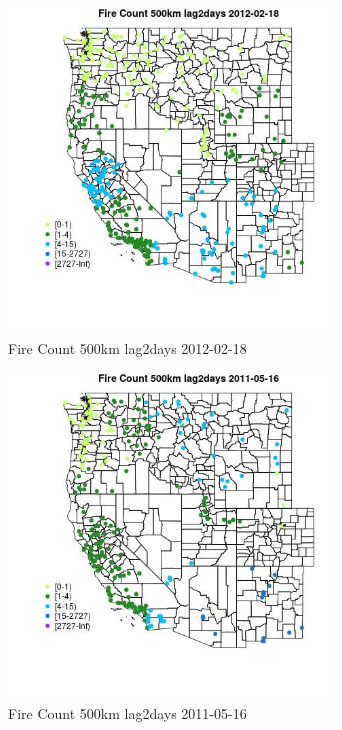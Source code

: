 \begin{figure} 
\centering  
\includegraphics[width=0.77\textwidth]{Code_Outputs/Report_ML_input_PM25_Step4_part_f_de_duplicated_aves_prioritize_24hr_obswNAs_MapObsFire_Count_500km_lag2days2012-02-18.jpg} 
\caption{\label{fig:Report_ML_input_PM25_Step4_part_f_de_duplicated_aves_prioritize_24hr_obswNAsMapObsFire_Count_500km_lag2days2012-02-18}Fire Count 500km lag2days 2012-02-18} 
\end{figure} 
 

\begin{figure} 
\centering  
\includegraphics[width=0.77\textwidth]{Code_Outputs/Report_ML_input_PM25_Step4_part_f_de_duplicated_aves_prioritize_24hr_obswNAs_MapObsFire_Count_500km_lag2days2011-05-16.jpg} 
\caption{\label{fig:Report_ML_input_PM25_Step4_part_f_de_duplicated_aves_prioritize_24hr_obswNAsMapObsFire_Count_500km_lag2days2011-05-16}Fire Count 500km lag2days 2011-05-16} 
\end{figure} 
 

